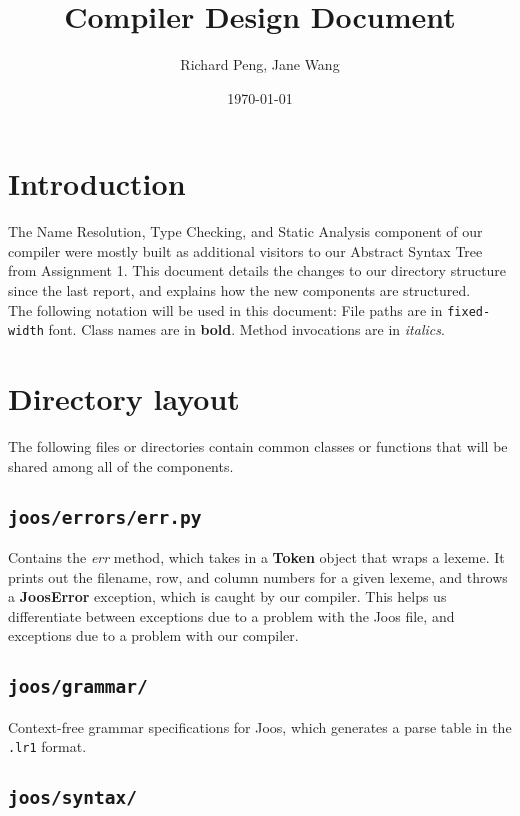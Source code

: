 \documentclass[12pt, a4paper]{article}
\title{Compiler Design Document}
\date{\today}
\author{Richard Peng, Jane Wang}
\newcommand{\class}{\textbf}
\newcommand{\fpath}{\verb}
\newcommand{\method}{\textit}
\begin{document}
\maketitle

\section{Introduction}

The Name Resolution, Type Checking, and Static Analysis component of our compiler were mostly built as additional visitors to our Abstract Syntax Tree from Assignment 1. This document details the changes to our directory structure since the last report, and explains how the new components are structured. \\

The following notation will be used in this document: File paths are in \fpath|fixed-width| font. Class names are in \class{bold}. Method invocations are in \textit{italics}.

\section{Directory layout}

The following files or directories contain common classes or functions that will be shared among all of the components.

\subsection{\texttt{joos/errors/err.py}}

Contains the \method{err} method, which takes in a \class{Token} object that wraps a lexeme. It prints out the filename, row, and column numbers for a given lexeme, and throws a \class{JoosError} exception, which is caught by our compiler. This helps us differentiate between exceptions due to a problem with the Joos file, and exceptions due to a problem with our compiler.

\subsection{\texttt{joos/grammar/}}

Context-free grammar specifications for Joos, which generates a parse table in the \verb|.lr1| format.

\subsection{\texttt{joos/syntax/}}
\end{document}
